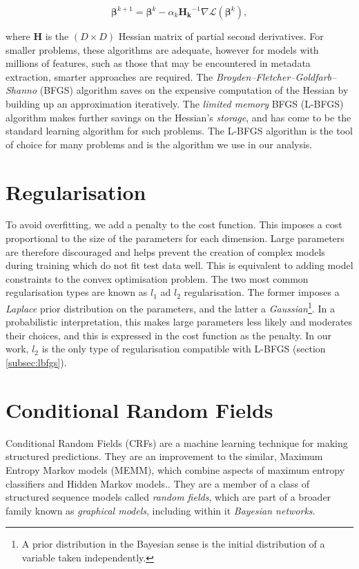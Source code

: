 \begin{equation}
\boldsymbol\beta^{k+1} = \boldsymbol\beta^{k} - \alpha_k \mathbf{H_k}^{-1}\nabla\mathcal{L}(\boldsymbol\beta^{k}),
\label{eq:newton}
\end{equation}

where $\mathbf{H}$ is the $(D \times D)$ Hessian matrix of partial second derivatives. For smaller problems, these algorithms are adequate, however for models with millions of features, such as those that may be encountered in metadata extraction, smarter approaches are required. The \emph{Broyden--Fletcher--Goldfarb--Shanno} (BFGS) algorithm saves on the expensive computation of the Hessian by building up an approximation iteratively. The \emph{limited memory} BFGS (L-BFGS) algorithm makes further savings on the Hessian's \emph{storage}, and has come to be the standard learning algorithm for such problems. The L-BFGS algorithm is the tool of choice for many problems\cite{murphy2012machine} and is the algorithm we use in our analysis.

\section{Regularisation}

To avoid overfitting, we add a penalty to the cost function. This imposes a cost proportional to the size of the parameters for each dimension. Large parameters are therefore discouraged and helps prevent the creation of complex models during training which do not fit test data well. This is equivalent to adding model constraints to the convex optimisation problem. The two most common regularisation types are known as $l_1$ ad $l_2$ regularisation. The former imposes a \emph{Laplace} prior distribution on the parameters, and the latter a \emph{Gaussian}\footnote{A prior distribution in the Bayesian sense is the initial distribution of a variable taken independently.}. In a probabilistic interpretation, this makes large parameters less likely and moderates their choices, and this is expressed in the cost function as the penalty. In our work, $l_2$ is the only type of regularisation compatible with L-BFGS (section \ref{subsec:lbfgs}).

\section{Conditional Random Fields}
\label{subsec:crfs}

Conditional Random Fields (CRFs) are a machine learning technique for making structured predictions. They are an improvement to the similar, Maximum Entropy Markov models (MEMM)\cite{mccallum2000maximum}, which combine aspects of maximum entropy classifiers and Hidden Markov models.\cite{lafferty2001conditional}. They are a member of a class of structured sequence models called \emph{random fields}, which are part of a broader family known as \emph{graphical models}, including within it \emph{Bayesian networks}.

